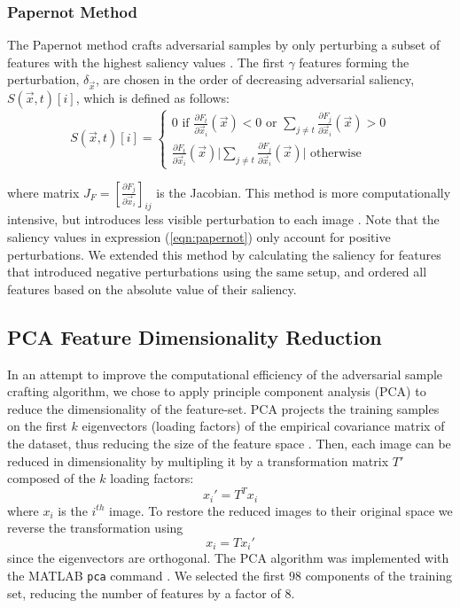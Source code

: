 \subsubsection{Papernot Method}

The Papernot method crafts adversarial samples by only perturbing a subset of features with the highest saliency values \cite{papernot1}. %
The first $\gamma$ features forming the perturbation, $\delta_{\vec{x}}$, are chosen in the order of decreasing adversarial saliency, $S(\vec{x},t)[i]$, which is defined as follows:
\begin{equation} \label{eqn:papernot}
	S(\vec{x},t)[i] = \begin{cases}
    0 \text{ if } \frac{\partial F_{t}}{\partial \vec{x}_{i}}(\vec{x}) < 0 \text{ or } \sum_{j \neq t} \frac{\partial F_{j}}{\partial \vec{x}_{i}}(\vec{x}) > 0 \\
   \frac{\partial F_{t}}{\partial \vec{x}_{i}}(\vec{x}) \vert \sum_{j \neq t} \frac{\partial F_{j}}{\partial \vec{x}_{i}}(\vec{x}) \vert \text{       otherwise}
\end{cases}
\end{equation}

where matrix $J_{F} = [\frac{\partial F_{j}}{\partial \vec{x}_{i}}]_{ij}$ is the Jacobian. This method is more computationally intensive, but introduces less visible perturbation to each image \cite{papernot1}. Note that the saliency values in expression (\ref{eqn:papernot}) only account for positive perturbations. We extended this method by calculating the saliency for features that introduced negative perturbations using the same setup, and ordered all features based on the absolute value of their saliency.

\subsection{PCA Feature Dimensionality Reduction} \label{sec:pca}
In an attempt to improve the computational efficiency of the adversarial sample crafting algorithm, we chose to apply principle component analysis (PCA) to reduce the dimensionality of the feature-set. PCA projects the training samples on the first $k$ eigenvectors (loading factors) of the empirical covariance matrix of the dataset, thus reducing the size of the feature space \cite{coursenotes}. Then, each image can be reduced in dimensionality by multipling it by a transformation matrix $T'$ composed of the $k$ loading factors:
\begin{equation}
x_i' = T^T x_i
\end{equation}
where $x_i$ is the $i^{th}$ image. To restore the reduced images to their original space we reverse the transformation using
\begin{equation}
x_i = T x_i' 
\end{equation}
since the eigenvectors are orthogonal. The PCA algorithm was implemented with the MATLAB \texttt{pca} command \cite{matlab}. We selected the first $98$ components of the training set, reducing the number of features by a factor of $8$. 